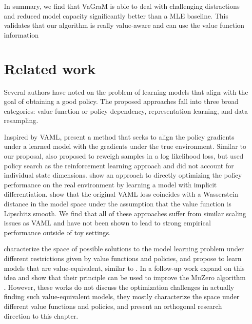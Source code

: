 In summary, we find that VaGraM is able to deal with challenging distractions and reduced model capacity significantly better than a MLE baseline. This validates that our algorithm is really value-aware and can use the value function information 

\section{Related work}

Several authors have noted on the problem of learning models that align with the goal of obtaining a good policy. The proposed approaches fall into three broad categories: value-function or policy dependency, representation learning, and data resampling.

Inspired by VAML, \cite{abachi2020policy} present a method that seeks to align the policy gradients under a learned model with the gradients under the true environment. Similar to our proposal, \cite{doro2020gradient} also proposed to reweigh samples in a log likelihood loss, but used policy search as the reinforcement learning approach and did not account for individual state dimensions. \cite{nikishin2021control} show an approach to directly optimizing the policy performance on the real environment by learning a model with implicit differentiation. \cite{asadi2018equivalence} show that the original VAML loss coincides with a Wasserstein distance in the model space under the assumption that the value function is Lipschitz smooth. We find that all of these approaches suffer from similar scaling issues as VAML and have not been shown to lead to strong empirical performance outside of toy settings.

\cite{grimm2020value} characterize the space of possible solutions to the model learning problem under different restrictions given by value functions and policies, and propose to learn models that are value-equivalent, similar to \cite{vaml}. In a follow-up work \cite{grimm2021proper} expand on this idea and show that their principle can be used to improve the MuZero algorithm \parencite{schrittwieser2020mastering}. However, these works do not discuss the optimization challenges in actually finding such value-equivalent models, they mostly characterize the space under different value functions and policies, and present an orthogonal research direction to this chapter.


